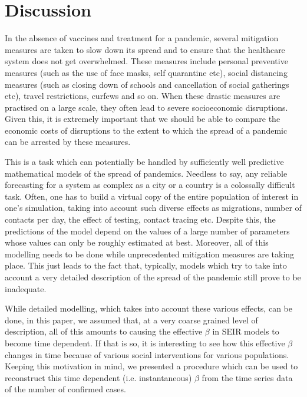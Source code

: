 \documentclass[aps,prd,10pt,twocolumn,nofootinbib]{revtex4-2}
\begin{document}
\section{Discussion}

In the absence of vaccines and treatment for a pandemic, several mitigation measures are taken to slow down its spread and to ensure that the healthcare system does not get overwhelmed. These measures include personal preventive measures (such as the use of face masks, self quarantine etc), social distancing measures (such as closing down of schools and cancellation of social gatherings etc), travel restrictions, curfews and so on.
When these drastic measures are practised on a large scale, they often lead to severe socioeconomic disruptions.
Given this, it is extremely important that we should be able to compare the economic costs of disruptions to the extent to which the spread of a pandemic can be arrested by these measures. 

This is a task which can potentially be handled by sufficiently well predictive mathematical models of the spread of pandemics. Needless to say, any reliable forecasting for a system as complex as a city or a country is a colossally difficult task. 
Often, one has to build a virtual copy of the entire population of interest in one's simulation, taking into account such diverse effects as migrations, number of contacts per day, the effect of testing, contact tracing etc. Despite this, the predictions of the model depend on the values of a large number of parameters whose values can only be roughly estimated at best.
Moreover, all of this modelling needs to be done while unprecedented mitigation measures are taking place. This just leads to the fact that, typically, models which try to take into account a very detailed description of the spread of the pandemic still prove to be inadequate.

While detailed modelling, which takes into account these various effects, can be done, in this paper, we assumed that, at a very coarse grained level of description, all of this amounts to causing the effective $\beta$ in SEIR models to become time dependent. If that is so, it is interesting to see how this effective $\beta$ changes in time because of various social interventions for various populations. Keeping this motivation in mind, we presented a procedure which can be used to reconstruct this time dependent (i.e. instantaneous) $\beta$ from the time series data of the number of confirmed cases. 
\end{document}

